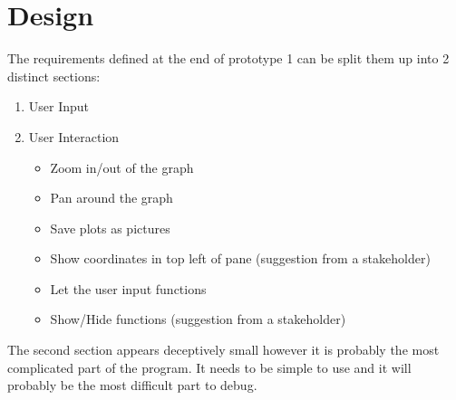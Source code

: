 \documentclass[../../../main.tex]{subfiles}
\begin{document}
\chapter{Design}
The requirements defined at the end of prototype 1 can be split them up into 2 distinct sections:
\begin{enumerate}
\item User Input
\item User Interaction
	\begin{itemize}
	\item Zoom in/out of the graph
	\item Pan around the graph
	\item Save plots as pictures
	\item Show coordinates in top left of pane (suggestion from a stakeholder)
	\end{itemize}
	\begin{itemize}
	\item Let the user input functions
	\item Show/Hide functions (suggestion from a stakeholder)
	\end{itemize}
\end{enumerate}
The second section appears deceptively small however it is probably the most complicated part of the program. It needs to be simple to use and it will probably be the most difficult part to debug.
\newpage
\end{document}

